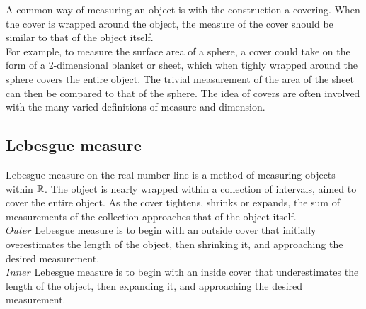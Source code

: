 \documentclass[11pt]{ekblite}
\begin{document}
A common way of measuring an object is with the construction a covering. When the cover is wrapped around the object, the measure of the cover should be similar to that of the object itself.
\\[0.2in]For example, to measure the surface area of a sphere, a cover could take on the form of a 2-dimensional blanket or sheet, which when tighly wrapped around the sphere covers the entire object. The trivial measurement of the area of the sheet can then be compared to that of the sphere. The idea of covers are often involved with the many varied definitions of measure and dimension.
\subsection{Lebesgue measure}
Lebesgue measure on the real number line is a method of measuring objects within $\mathbb{R}$. The object is nearly wrapped within a collection of intervals, aimed to cover the entire object. As the cover tightens, shrinks or expands, the sum of measurements of the collection approaches that of the object itself.
\\[0.2in]$\textit{Outer}$ Lebesgue measure is to begin with an outside cover that initially overestimates the length of the object, then shrinking it, and approaching the desired measurement.\cite{edgar}
\\[0.2in]$\textit{Inner}$ Lebesgue measure is to begin with an inside cover that underestimates the length of the object, then expanding it, and approaching the desired measurement.\cite{edgar}
\begin{definition}
	
\end{definition}

\newpage
\end{document}
